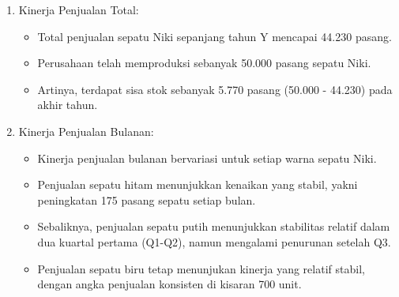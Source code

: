 \documentclass[letterpaper,11pt]{article}
\begin{document}
  \begin{enumerate}
      \item Kinerja Penjualan Total:
      \begin{itemize}
          \item Total penjualan sepatu Niki sepanjang tahun Y mencapai 44.230 pasang.
          \item Perusahaan telah memproduksi sebanyak 50.000 pasang sepatu Niki.
          \item Artinya, terdapat sisa stok sebanyak 5.770 pasang (50.000 - 44.230) pada akhir tahun.
      \end{itemize}

      \item Kinerja Penjualan Bulanan:
      \begin{itemize}
          \item Kinerja penjualan bulanan bervariasi untuk setiap warna sepatu Niki.
          \item Penjualan sepatu hitam menunjukkan kenaikan yang stabil, yakni peningkatan 175 pasang sepatu setiap bulan. 
          \item Sebaliknya, penjualan sepatu putih menunjukkan stabilitas relatif dalam dua kuartal pertama (Q1-Q2), namun mengalami penurunan setelah Q3.          
          \item Penjualan sepatu biru tetap menunjukan kinerja yang relatif stabil, dengan angka penjualan konsisten di kisaran 700 unit. 
      \end{itemize}
      
      \begin{center}
      \end{center}


\end{enumerate}
\end{document}

